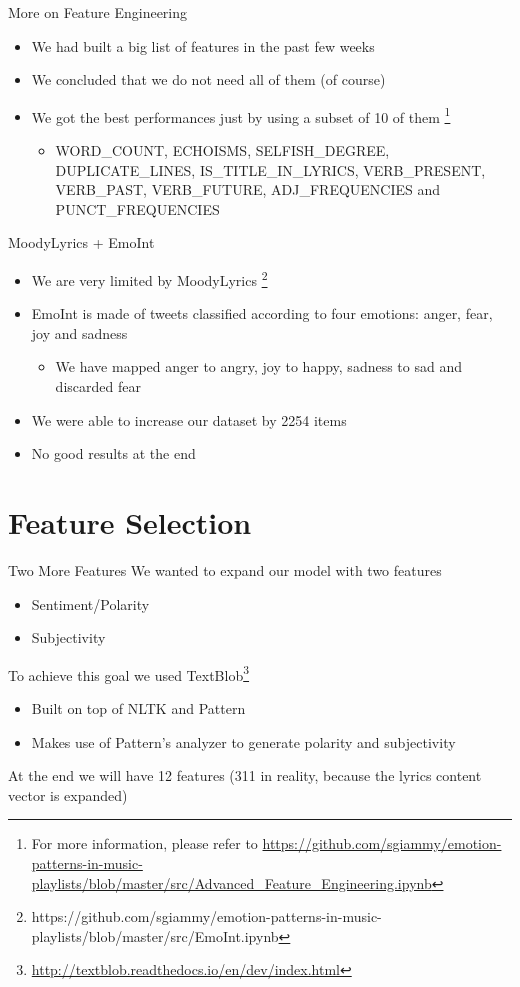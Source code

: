 \documentclass[xcolor=dvipsnames]{beamer}
\begin{document}
\begin{frame}{More on Feature Engineering}
\begin{itemize}
\item We had built a big list of features in the past few weeks
\item We concluded that we do not need all of them (of course)
\item We got the best performances just by using a subset of 10 of them
	\footnote{For more information, please refer to \url{https://github.com/sgiammy/emotion-patterns-in-music-playlists/blob/master/src/Advanced_Feature_Engineering.ipynb}}
	\begin{itemize}
	\item WORD\_COUNT, ECHOISMS, SELFISH\_DEGREE, DUPLICATE\_LINES, IS\_TITLE\_IN\_LYRICS, VERB\_PRESENT, VERB\_PAST, VERB\_FUTURE, ADJ\_FREQUENCIES and PUNCT\_FREQUENCIES
	\end{itemize}
\end{itemize}
\end{frame}

\begin{frame}{MoodyLyrics + EmoInt}
\begin{itemize}
\item We are very limited by MoodyLyrics
	\footnote{https://github.com/sgiammy/emotion-patterns-in-music-playlists/blob/master/src/EmoInt.ipynb}
\item EmoInt is made of tweets classified according to four emotions: anger, fear, joy and sadness
	\begin{itemize}
	\item We have mapped anger to angry, joy to happy, sadness to sad and discarded fear
	\end{itemize}
\item We were able to increase our dataset by 2254 items
\item No good results at the end
\end{itemize}
\end{frame}

\section{Feature Selection}

\begin{frame}{Two More Features}
We wanted to expand our model with two features
\begin{itemize}
\item Sentiment/Polarity
\item Subjectivity
\end{itemize}
To achieve this goal we used TextBlob\footnote{\url{http://textblob.readthedocs.io/en/dev/index.html}}
\begin{itemize}
\item Built on top of NLTK and Pattern
\item Makes use of Pattern's analyzer to generate polarity and subjectivity
\end{itemize}
At the end we will have 12 features (311 in reality, because the lyrics content vector is expanded)
\end{frame}
\end{document}
